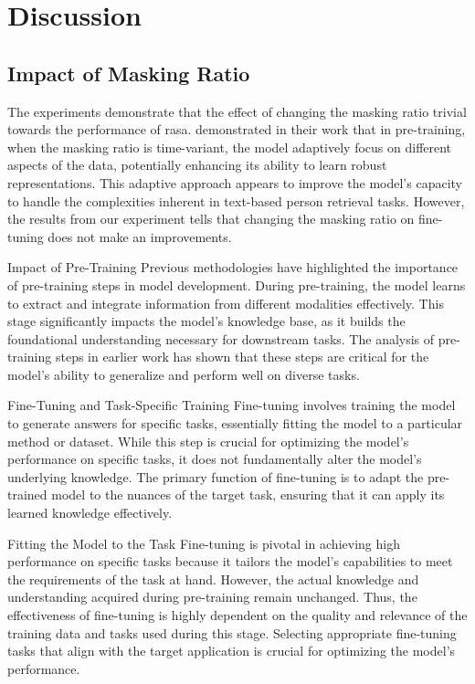 \section{Discussion}
\subsection{Impact of Masking Ratio}

The experiments demonstrate that the effect of changing the masking ratio trivial towards the performance of \acrshort{rasa}. \cite{yang2023learningbettermaskingbetter} demonstrated in their work that in pre-training, when the masking ratio is time-variant, the model adaptively focus on different aspects of the data, potentially enhancing its ability to learn robust representations. This adaptive approach appears to improve the model's capacity to handle the complexities inherent in text-based person retrieval tasks. However, the results from our experiment tells that changing the masking ratio on fine-tuning does not make an improvements. 

Impact of Pre-Training
Previous methodologies have highlighted the importance of pre-training steps in model development. During pre-training, the model learns to extract and integrate information from different modalities effectively. This stage significantly impacts the model's knowledge base, as it builds the foundational understanding necessary for downstream tasks. The analysis of pre-training steps in earlier work has shown that these steps are critical for the model's ability to generalize and perform well on diverse tasks.

Fine-Tuning and Task-Specific Training
Fine-tuning involves training the model to generate answers for specific tasks, essentially fitting the model to a particular method or dataset. While this step is crucial for optimizing the model's performance on specific tasks, it does not fundamentally alter the model's underlying knowledge. The primary function of fine-tuning is to adapt the pre-trained model to the nuances of the target task, ensuring that it can apply its learned knowledge effectively.

Fitting the Model to the Task
Fine-tuning is pivotal in achieving high performance on specific tasks because it tailors the model's capabilities to meet the requirements of the task at hand. However, the actual knowledge and understanding acquired during pre-training remain unchanged. Thus, the effectiveness of fine-tuning is highly dependent on the quality and relevance of the training data and tasks used during this stage. Selecting appropriate fine-tuning tasks that align with the target application is crucial for optimizing the model's performance.



